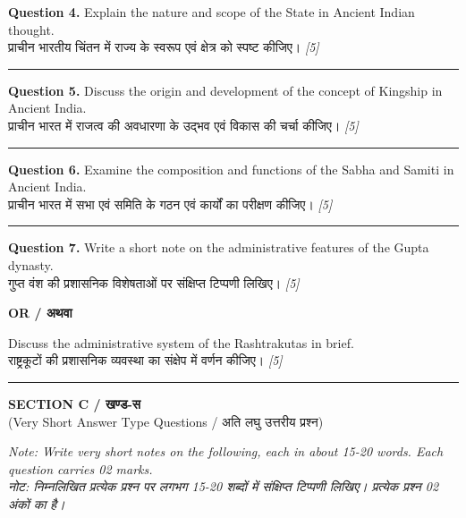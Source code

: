\documentclass[11pt,a4paper]{article}
\newcommand{\pts}[1]{\hfill \textit{[#1]}}
\begin{document}
\noindent \textbf{Question 4.} Explain the nature and scope of the State in Ancient Indian thought.\\[1pt]
प्राचीन भारतीय चिंतन में राज्य के स्वरूप एवं क्षेत्र को स्पष्ट कीजिए। \pts{5}

\medskip\rule{\linewidth}{0.2pt}\medskip

\noindent \textbf{Question 5.} Discuss the origin and development of the concept of Kingship in Ancient India.\\[1pt]
प्राचीन भारत में राजत्व की अवधारणा के उद्भव एवं विकास की चर्चा कीजिए। \pts{5}

\medskip\rule{\linewidth}{0.2pt}\medskip

\noindent \textbf{Question 6.} Examine the composition and functions of the Sabha and Samiti in Ancient India.\\[1pt]
प्राचीन भारत में सभा एवं समिति के गठन एवं कार्यों का परीक्षण कीजिए। \pts{5}

\medskip\rule{\linewidth}{0.2pt}\medskip

\noindent \textbf{Question 7.} Write a short note on the administrative features of the Gupta dynasty.\\[1pt]
गुप्त वंश की प्रशासनिक विशेषताओं पर संक्षिप्त टिप्पणी लिखिए। \pts{5}

\begin{center}
  \textbf{OR / अथवा}
\end{center}

\noindent Discuss the administrative system of the Rashtrakutas in brief.\\[1pt]
राष्ट्रकूटों की प्रशासनिक व्यवस्था का संक्षेप में वर्णन कीजिए। \pts{5}

\bigskip
\rule{\linewidth}{0.2pt}
\bigskip

\begin{center}
  {\large\bfseries SECTION C / खण्ड-स}\\[2pt]
  {\normalsize (Very Short Answer Type Questions / अति लघु उत्तरीय प्रश्न)}
\end{center}

\noindent \textit{Note: Write very short notes on the following, each in about 15-20 words. Each question carries 02 marks.}\\[2pt]
\noindent \textit{नोट: निम्नलिखित प्रत्येक प्रश्न पर लगभग 15-20 शब्दों में संक्षिप्त टिप्पणी लिखिए। प्रत्येक प्रश्न 02 अंकों का है।}

\bigskip
\end{document}

